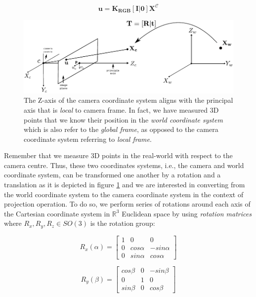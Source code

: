 \documentclass[a4paper]{report}
\numberwithin{figure}{section}
\newcommand{\R}{\mathbb{R}}
\begin{document}
\begin{equation}\label{eq:simplyfied_proj_func}
  \mathbf{u} = \mathbf{K_{RGB}}[\mathbf{I}|\mathbf{0}]\mathbf{X^{\mathcal{C}}}
\end{equation} 

\begin{figure}[H]
	\centering
  \includegraphics[width=\linewidth,natwidth=640,natheight=640]
  {fig/drawings/pinhole_world_to_cam.pdf}
  \caption[Extrinsic Matrix]{The Z-axis of the camera coordinate system aligns 
  with the principal axis that is \textit{local} to camera frame. In fact, we 
  have measured 3D points that we know their position in the \textit{world 
  coordinate system} which is also refer to the \textit{global frame}, as 
  opposed to the camera coordinate system referring to
\textit{local frame}.}
  \label{fig:cam_model_rot_trans}
\end{figure}

Remember that we measure 3D points in the real-world with respect to the 
camera centre.  Thus, these two coordinates systems, i.e., the camera and 
world coordinate system, can be transformed one another by a rotation and a 
translation as it is depicted in figure \ref{fig:cam_model_rot_trans} and we 
are interested in converting from the world coordinate system to the camera 
coordinate system in the context of projection operation.  To do so, we 
perform series of rotations around each axis of the Cartesian coordinate 
system in $\R^3$ Euclidean space by using \textit{rotation matrices} where 
$R_x, R_y, R_z \in SO(3)$ is the rotation group:

\begin{equation}
  R_x(\alpha) = 
  \begin{bmatrix}
    1 & 0 & 0\\
    0 & cos\alpha & -sin\alpha\\
    0 & sin\alpha & cos\alpha
  \end{bmatrix}\label{eq:rot_matrx_x}
\end{equation} 

\begin{equation}
  R_y(\beta) = 
  \begin{bmatrix}
    cos\beta & 0 & -sin\beta\\
    0 & 1 & 0\\
    sin\beta & 0 & cos\beta
  \end{bmatrix}\label{eq:rot_matrx_y}
\end{equation} 
\end{document}
